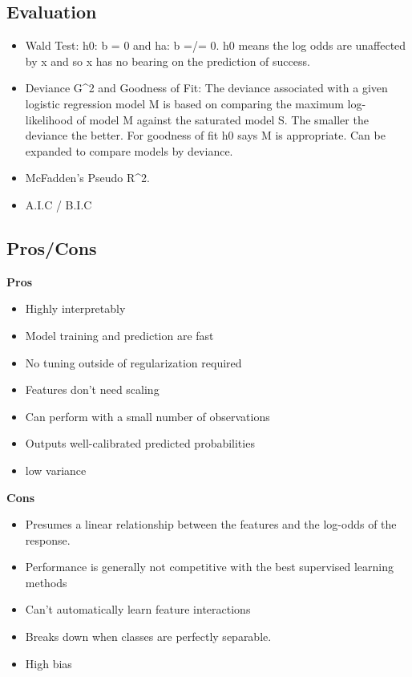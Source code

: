 \documentclass[]{book}
\theoremstyle{definition}
\theoremstyle{definition}
\theoremstyle{definition}
\theoremstyle{remark}
\begin{document}
\subsection{Evaluation}\label{evaluation-8}

\begin{itemize}
\item
  Wald Test: h0: b = 0 and ha: b =/= 0. h0 means the log odds are
  unaffected by x and so x has no bearing on the prediction of success.
\item
  Deviance G\^{}2 and Goodness of Fit: The deviance associated with a
  given logistic regression model M is based on comparing the maximum
  log-likelihood of model M against the saturated model S. The smaller
  the deviance the better. For goodness of fit h0 says M is appropriate.
  Can be expanded to compare models by deviance.
\item
  McFadden's Pseudo R\^{}2.
\item
  A.I.C / B.I.C
\end{itemize}

\subsection{Pros/Cons}\label{proscons-8}

\textbf{Pros}

\begin{itemize}
\item
  Highly interpretably
\item
  Model training and prediction are fast
\item
  No tuning outside of regularization required
\item
  Features don't need scaling
\item
  Can perform with a small number of observations
\item
  Outputs well-calibrated predicted probabilities
\item
  low variance
\end{itemize}

\textbf{Cons}

\begin{itemize}
\item
  Presumes a linear relationship between the features and the log-odds
  of the response.
\item
  Performance is generally not competitive with the best supervised
  learning methods
\item
  Can't automatically learn feature interactions
\item
  Breaks down when classes are perfectly separable.
\item
  High bias
\end{itemize}
\end{document}

